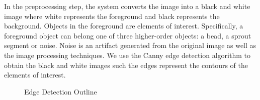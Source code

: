 \documentclass{sig-alternate}
\begin{document}
	In the preprocessing step, the system converts the image into a black
	and white image where white represents the foreground and black
	represents the background. Objects in the foreground are elements of
	interest. Specifically, a foreground object can belong one of three
	higher-order objects: a bead, a sprout segment or noise. Noise is an
	artifact generated from the original image as well as the image
	processing techniques. We use the Canny edge detection algorithm
	\cite{canny86} to obtain the black and white images such the edges
	represent the contours of the elements of interest.
	\begin{figure}[htp!]
		\centering
		\caption{Edge Detection Outline}
		\label{fig:beadex}
	\end{figure}
	
\end{document}
